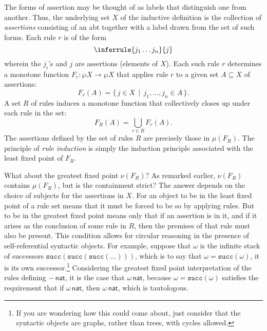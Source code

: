 \documentclass[11pt,twoside]{article}
\newcommand{\IsNat}[1]{{#1}\,\mathsf{nat}}
\newcommand{\succnat}[1]{\mathtt{succ}(#1)}
\begin{document}
The forms of assertion may be thought of as labels that distinguish one from another.  Thus, the
underlying set $X$ of the inductive definition is the collection of \emph{assertions} consisting of
an abt together with a label drawn from the set of such forms.  Each rule $r$ is of the form
\begin{displaymath}
  \inferrule
  {j_{1} \dots j_{n}}
  {j}
\end{displaymath}
wherein the $j_{i}$'s and $j$ are assertions (elements of $X$).  Each such rule $r$
determines a monotone function $F_{r}:\wp{X}\to\wp{X}$ that applies rule $r$ to a given set
$A\subseteq X$ of assertions:
\begin{displaymath}
  F_{r}(A)=\{\, j\in X \,\mid\, j_{1},\dots,j_{n}\in A\,\}.
\end{displaymath}
A set $R$ of rules induces a monotone function that collectively closes up under each rule in the
set:
\begin{displaymath}
  F_{R}(A) = \bigcup_{r\in R} F_{r}(A).
\end{displaymath}
The assertions defined by the set of rules $R$ are precisely those in $\mu(F_{R})$.  The
principle of \emph{rule induction} is simply the induction principle associated with the
least fixed point of $F_{R}$.

\smallskip

What about the greatest fixed point $\nu(F_{R})$?  As remarked earlier, $\nu(F_{R})$ contains
$\mu(F_{R})$, but is the containment strict?  The answer depends on the choice of subjects
for the assertions in $X$.  For an object to be in the least fixed point of a rule set
means that it must be forced to be so by applying rules.  But to be in the greatest fixed
point means only that if an assertion is in it, and if it arises as the conclusion of some
rule in $R$, then the premises of that rule must also be present.  This condition allows
for circular reasoning in the presence of self-referential syntactic objects.  For
example, suppose that $\omega$ is the infinite stack of successors
$\succnat{\succnat{\succnat{\dots}}}$, which is to say that $\omega=\succnat{\omega}$, it is its own
successor.\footnote{If you are wondering how this could come about, just consider that the
  syntactic objects are graphs, rather than trees, with cycles allowed.}  Considering the
greatest fixed point interpretation of the rules defining $\IsNat{-}$, it is the case that
$\IsNat{\omega}$, because $\omega=\succnat{\omega}$ satisfies the requirement that if
$\IsNat{\omega}$, then $\IsNat{\omega}$, which is tautologous.



\end{document}
